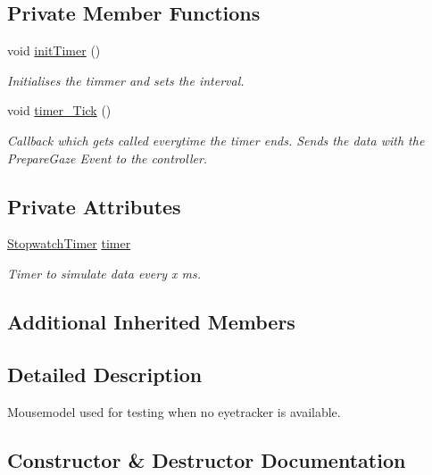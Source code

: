 \subsection*{Private Member Functions}
\begin{DoxyCompactItemize}
\item 
void \hyperlink{class_web_analyzer_1_1_test_1_1_communication_1_1_mouse_model_ab5f8535f5bfb5970dcc3b9b21fb575ff}{init\+Timer} ()
\begin{DoxyCompactList}\small\item\em Initialises the timmer and sets the interval. \end{DoxyCompactList}\item 
void \hyperlink{class_web_analyzer_1_1_test_1_1_communication_1_1_mouse_model_af4b46621b6d50778b6f0f1c03b4ddb3a}{timer\+\_\+\+Tick} ()
\begin{DoxyCompactList}\small\item\em Callback which gets called everytime the timer ends. Sends the data with the Prepare\+Gaze Event to the controller. \end{DoxyCompactList}\end{DoxyCompactItemize}
\subsection*{Private Attributes}
\begin{DoxyCompactItemize}
\item 
\hyperlink{class_web_analyzer_1_1_util_1_1_stopwatch_timer}{Stopwatch\+Timer} \hyperlink{class_web_analyzer_1_1_test_1_1_communication_1_1_mouse_model_a23daaf5b022d16c45c6f9d0084da2819}{timer}
\begin{DoxyCompactList}\small\item\em Timer to simulate data every x ms. \end{DoxyCompactList}\end{DoxyCompactItemize}
\subsection*{Additional Inherited Members}


\subsection{Detailed Description}
Mousemodel used for testing when no eyetracker is available. 



\subsection{Constructor \& Destructor Documentation}
\hypertarget{class_web_analyzer_1_1_test_1_1_communication_1_1_mouse_model_ad84f4a65000f2e03f7003546d5e63dd2}{}
